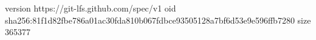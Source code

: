 version https://git-lfs.github.com/spec/v1
oid sha256:81f1d82fbe786a01ac30fda810b067fdbce93505128a7bf6d53e9e596ffb7280
size 365377
